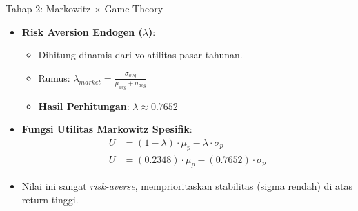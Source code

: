 \documentclass{beamer}
\begin{document}
\begin{frame}{Tahap 2: Markowitz $\times$ Game Theory}
    \begin{itemize}
        \item \textbf{Risk Aversion Endogen ($\lambda$)}:
        \begin{itemize}
            \item Dihitung dinamis dari volatilitas pasar tahunan.
            \item Rumus: $\lambda_{market} = \frac{\sigma_{avg}}{\mu_{avg} + \sigma_{avg}}$
            \item \textbf{Hasil Perhitungan}: $\lambda \approx 0.7652$
        \end{itemize}
        \vspace{0.3cm}
        \item \textbf{Fungsi Utilitas Markowitz Spesifik}:
        \begin{align*}
             U &= (1-\lambda)\cdot\mu_p - \lambda\cdot\sigma_p \\
             U &= (0.2348)\cdot\mu_p - (0.7652)\cdot\sigma_p
        \end{align*}
        \item Nilai ini sangat \textit{risk-averse}, memprioritaskan stabilitas (sigma rendah) di atas return tinggi.
    \end{itemize}
\end{frame}
\end{document}
